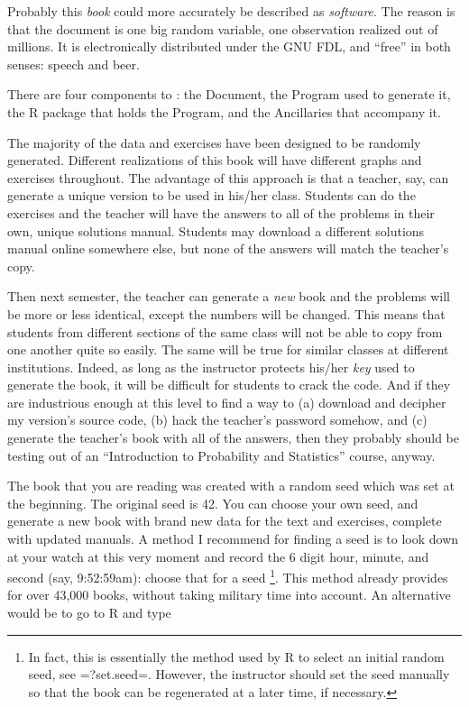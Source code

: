 \documentclass[captions=tableheading]{scrbook}
\begin{document}
\label{cha:Instructions-for-Instructors}



Probably this \emph{book} could more accurately be described as \emph{software}. The reason is that the document is one big random variable, one observation realized out of millions. It is electronically distributed under the GNU FDL, and ``free'' in both senses: speech and beer.  

There are four components to \IPSUR: the Document, the Program used to generate it, the \textsf{R} package that holds the Program, and the Ancillaries that accompany it.

The majority of the data and exercises have been designed to be randomly generated. Different realizations of this book will have different graphs and exercises throughout. The advantage of this approach is that a teacher, say, can generate a unique version to be used in his/her class. Students can do the exercises and the teacher will have the answers to all of the problems in their own, unique solutions manual. Students may download a different solutions manual online somewhere else, but none of the answers will match the teacher's copy. 

Then next semester, the teacher can generate a \emph{new} book and the problems will be more or less identical, except the numbers will be changed. This means that students from different sections of the same class will not be able to copy from one another quite so easily. The same will be true for similar classes at different institutions. Indeed, as long as the instructor protects his/her \emph{key} used to generate the book, it will be difficult for students to crack the code. And if they are industrious enough at this level to find a way to (a) download and decipher my version's source code, (b) hack the teacher's password somehow, and (c) generate the teacher's book with all of the answers, then they probably should be testing out of an ``Introduction to Probability and Statistics'' course, anyway. 

The book that you are reading was created with a random seed which was set at the beginning. The original seed is 42. You can choose your own seed, and generate a new book with brand new data for the text and exercises, complete with updated manuals. A method I recommend for finding a seed is to look down at your watch at this very moment and record the 6 digit hour, minute, and second (say, 9:52:59am): choose that for a seed
\footnote{In fact, this is essentially the method used by \textsf{R} to select an initial random seed, see =?set.seed=. However, the instructor should set the seed manually so that the book can be regenerated at a later time, if necessary.}.
This method already provides for over 43,000 books, without taking military time into account. An alternative would be to go to \textsf{R} and type 
\end{document}

